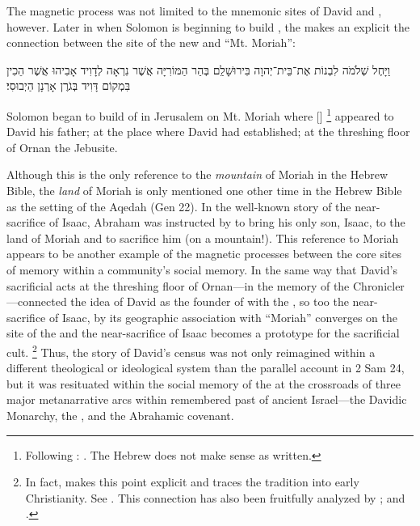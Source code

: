 The magnetic process was not limited to the mnemonic sites of David and \thetemple, however. Later in \chronicles when Solomon is beginning to build \thetemple, the \chronicler makes an explicit the connection between the site of the new \temple and ``Mt. Moriah'':
\begin{hebrewtext}
    וַיָּחֶל שְׁלֹמֹה לִבְנוֹת אֶת־בֵּית־יְהוָה בִּירוּשָׁלִַם בְּהַר הַמּוֹרִיָּה אֲשֶׁר נִרְאָה לְדָוִיד אָבִיהוּ אֲשֶׁר הֵכִין בִּמְקוֹם דָּוִיד בְּגֹרֶן אָרְנָן הַיְבוּסִי׃
\end{hebrewtext}
\begin{translation}
    Solomon began to build \thetemple of \yahweh in Jerusalem on Mt. Moriah where [\yahweh]%
        \footnote{Following \lxx: 
        .
        The Hebrew does not make sense as written.}
    appeared to David his father;
    at the place where David had established; 
    at the threshing floor of Ornan the Jebusite.
\end{translation}
\noindent
Although this is the only reference to the \emph{mountain} of Moriah in the Hebrew Bible, the \emph{land} of Moriah is only mentioned one other time in the Hebrew Bible as the setting of the Aqedah (Gen 22). In the well-known story of the near-sacrifice of Isaac, Abraham was instructed by \yahweh to bring his only son, Isaac,  to the land of Moriah and to sacrifice him (on a mountain!). This reference to Moriah appears to be another example of the magnetic processes between the core sites of memory within a community's social memory. In the same way that David's sacrificial acts at the threshing floor of Ornan---in the memory of the Chronicler---connected the idea of David as the founder of \thetemple with the \jerusalemtemple, so too the near-sacrifice of Isaac, by its geographic association with ``Moriah'' converges on the site of the \jerusalemtemple and the near-sacrifice of Isaac becomes a prototype for the sacrificial cult.%
    \footnote{In fact, \vermes makes this point explicit and traces the tradition into early Christianity. See \cite[204--211]{vermes1961}. This connection has also been fruitfully analyzed by \cite{kalimi_htr1990}; \cite[190--191]{kalimi_jnes2009} and \cite{amit_brenner-polak2009}.}
Thus, the story of David's census was not only reimagined within a different theological or ideological system than the parallel account in 2 Sam 24, but it was resituated within the social memory of the \chronicler at the crossroads of three major metanarrative arcs within remembered past of ancient Israel---the Davidic Monarchy, the \jerusalemtemple, and the Abrahamic covenant.

